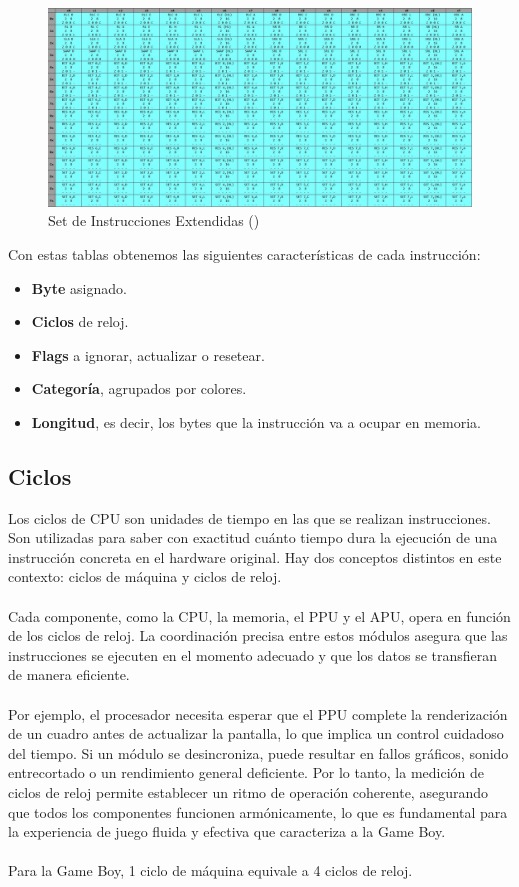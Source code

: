 \begin{figure}[H]
\centering
\includegraphics[width=1\textwidth]{include/images/opcodes_2.jpg}
\caption{Set de Instrucciones Extendidas (\cite{opcodes})}
\label{figure:opcodes_2}
\end{figure}

Con estas tablas obtenemos las siguientes características de cada instrucción:
\begin{itemize}
    \item \textbf{Byte} asignado.
    \item \textbf{Ciclos} de reloj.
    \item \textbf{Flags} a ignorar, actualizar o resetear.
    \item \textbf{Categoría}, agrupados por colores.
    \item \textbf{Longitud}, es decir, los bytes que la instrucción va a ocupar en memoria.
\end{itemize}

\subsection{Ciclos}

Los ciclos de CPU son unidades de tiempo en las que se realizan instrucciones. Son utilizadas para saber con exactitud cuánto tiempo dura la ejecución de una instrucción concreta en el hardware original. Hay dos conceptos distintos en este contexto: ciclos de máquina y ciclos de reloj.
\\\\
Cada componente, como la CPU, la memoria, el PPU y el APU, opera en función de los ciclos de reloj. La coordinación precisa entre estos módulos asegura que las instrucciones se ejecuten en el momento adecuado y que los datos se transfieran de manera eficiente.
\\\\
Por ejemplo, el procesador necesita esperar que el PPU complete la renderización de un cuadro antes de actualizar la pantalla, lo que implica un control cuidadoso del tiempo. Si un módulo se desincroniza, puede resultar en fallos gráficos, sonido entrecortado o un rendimiento general deficiente. Por lo tanto, la medición de ciclos de reloj permite establecer un ritmo de operación coherente, asegurando que todos los componentes funcionen armónicamente, lo que es fundamental para la experiencia de juego fluida y efectiva que caracteriza a la Game Boy.
\\\\
Para la Game Boy, 1 ciclo de máquina equivale a 4 ciclos de reloj.

